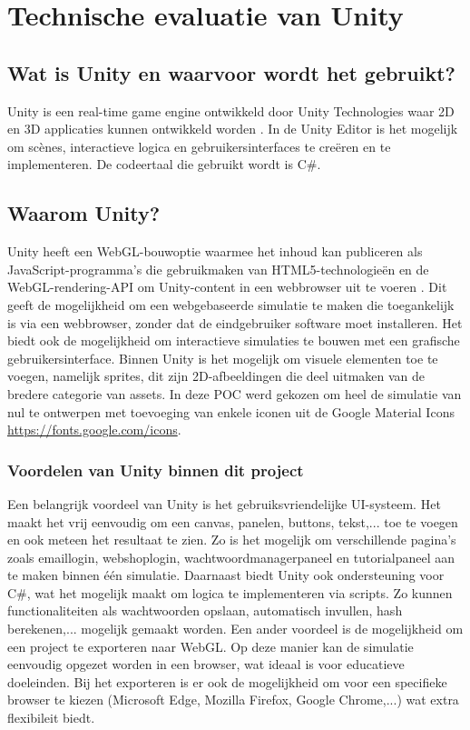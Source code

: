 \chapter{Technische evaluatie van Unity}

\section{Wat is Unity en waarvoor wordt het gebruikt?}

Unity is een real-time game engine ontwikkeld door Unity Technologies waar 2D en 3D applicaties kunnen ontwikkeld worden \autocite{Unity}. 
In de Unity Editor is het mogelijk om scènes, interactieve logica en gebruikersinterfaces te creëren en te implementeren. De codeertaal die gebruikt wordt is C\#. 

\section{Waarom Unity?}

Unity heeft een WebGL-bouwoptie waarmee het inhoud kan publiceren als JavaScript-programma's die gebruikmaken van HTML5-technologieën en de WebGL-rendering-API om Unity-content in een webbrowser uit te voeren \autocite{WebGL}.
Dit geeft de mogelijkheid om een webgebaseerde simulatie te maken die toegankelijk is via een webbrowser, zonder dat de eindgebruiker software moet installeren. Het biedt ook de mogelijkheid om interactieve simulaties te bouwen met een grafische gebruikersinterface.
Binnen Unity is het mogelijk om visuele elementen toe te voegen, namelijk sprites, dit zijn 2D-afbeeldingen die deel uitmaken van de bredere categorie van assets. In deze POC werd gekozen om heel de simulatie van nul te ontwerpen met toevoeging van enkele iconen uit de Google Material Icons \url{https://fonts.google.com/icons}.

\subsection{Voordelen van Unity binnen dit project}

Een belangrijk voordeel van Unity is het gebruiksvriendelijke UI-systeem. Het maakt het vrij eenvoudig om een canvas, panelen, buttons, tekst,... toe te voegen en ook meteen het resultaat te zien. Zo is het mogelijk om verschillende pagina's zoals emaillogin, webshoplogin, wachtwoordmanagerpaneel en tutorialpaneel aan te maken binnen één simulatie.
Daarnaast biedt Unity ook ondersteuning voor C\#, wat het mogelijk maakt om logica te implementeren via scripts. Zo kunnen functionaliteiten als wachtwoorden opslaan, automatisch invullen, hash berekenen,... mogelijk gemaakt worden.
Een ander voordeel is de mogelijkheid om een project te exporteren naar WebGL. Op deze manier kan de simulatie eenvoudig opgezet worden in een browser, wat ideaal is voor educatieve doeleinden. Bij het exporteren is er ook de mogelijkheid om voor een specifieke browser te kiezen (Microsoft Edge, Mozilla Firefox, Google Chrome,...) wat extra flexibileit biedt.

